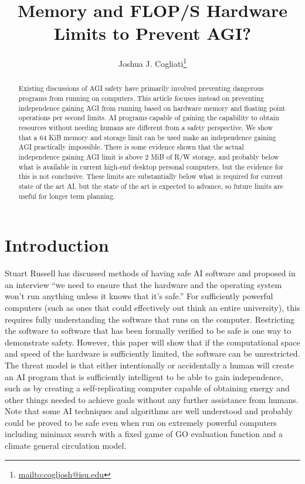 \documentclass[letterpaper,twocolumn]{article}
\title{Memory and FLOP/S Hardware Limits to Prevent AGI?}
\author{Joshua J. Cogliati\footnote{\url{mailto:cogljosh@isu.edu}}}
\begin{document}
\maketitle

\begin{abstract}
Existing discussions of AGI safety have primarily involved preventing
dangerous programs from running on computers. This article focuses
instead on preventing independence gaining AGI from running based on
hardware memory and floating point operations per second limits. AI
programs capable of gaining the capability to obtain resources without
needing humans are different from a safety perspective. We show that a
64 KiB memory and storage limit can be used make an independence
gaining AGI practically impossible. There is some evidence shown that
the actual independence gaining AGI limit is above 2 MiB of R/W
storage, and probably below what is available in current high-end
desktop personal computers, but the evidence for this is not
conclusive. These limits are substantially below what is required for
current state of the art AI, but the state of the art is expected to
advance, so future limits are useful for longer term planning.
\end{abstract}

\section{Introduction}


Stuart Russell has discussed methods of having safe AI software
\citep{humancompatible} and proposed in an interview
\citep{russellCnnInterview} ``we need to ensure that the hardware and
the operating system won’t run anything unless it knows that it’s
safe.'' For sufficiently powerful computers (such as ones that could
effectively out think an entire university), this requires fully
understanding the software that runs on the computer. Restricting the
software to software that has been formally verified to be safe is one
way to demonstrate safety. However, this paper will show that if the
computational space and speed of the hardware is sufficiently limited,
the software can be unrestricted. The threat model is that either
intentionally or accidentally a human will create an AI program that
is sufficiently intelligent to be able to gain independence, such as
by creating a self-replicating computer capable of obtaining energy
and other things needed to achieve goals without any further
assistance from humans. Note that some AI techniques and algorithms
are well understood and probably could be proved to be safe even when
run on extremely powerful computers including minimax search with a
fixed game of GO evaluation function and a climate general circulation
model.
\end{document}
